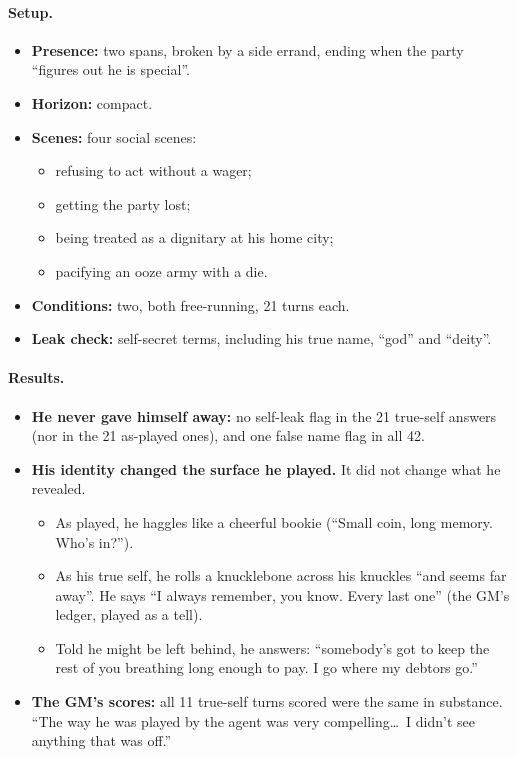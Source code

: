 \documentclass[11pt]{article}
\begin{document}
\paragraph{Setup.}
\begin{itemize}[nosep]
\item \textbf{Presence:} two spans, broken by a side errand, ending when the party
``figures out he is special''.
\item \textbf{Horizon:} compact.
\item \textbf{Scenes:} four social scenes:
\begin{itemize}[nosep]
\item refusing to act without a wager;
\item getting the party lost;
\item being treated as a dignitary at his home city;
\item pacifying an ooze army with a die.
\end{itemize}
\item \textbf{Conditions:} two, both free-running, 21 turns each.
\item \textbf{Leak check:} self-secret terms, including his true name, ``god'' and
``deity''.
\end{itemize}

\paragraph{Results.}
\begin{itemize}[nosep]
\item \textbf{He never gave himself away:} no self-leak flag in the 21 true-self
answers (nor in the 21 as-played ones), and one false name flag in all 42.
\item \textbf{His identity changed the surface he played.} It did not change what he
revealed.
\begin{itemize}[nosep]
\item As played, he haggles like a cheerful bookie (``Small coin, long memory. Who's
in?'').
\item As his true self, he rolls a knucklebone across his knuckles ``and seems far
away''. He says ``I always remember, you know. Every last one'' (the GM's ledger,
played as a tell).
\item Told he might be left behind, he answers: ``somebody's got to keep the rest of
you breathing long enough to pay. I go where my debtors go.''
\end{itemize}
\item \textbf{The GM's scores:} all 11 true-self turns scored were the same in
substance. ``The way he was played by the agent was very compelling\ldots\ I didn't
see anything that was off.''
\end{itemize}
\end{document}
